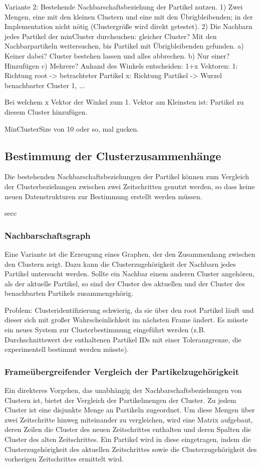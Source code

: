 Variante 2: Bestehende Nachbarschaftsbeziehung der Partikel nutzen.
1) Zwei Mengen, eine mit den kleinen Clustern und eine mit den Übrigbleibenden; in der Implementation nicht nötig (Clustergröße wird direkt getestet).
2) Die Nachbarn jedes Partikel der minCluster durchsuchen: gleicher Cluster? Mit den Nachbarpartikeln weitersuchen, bis Partikel mit Übrigbleibenden gefunden.
a) Keiner dabei? Cluster bestehen lassen und alles abbrechen.
b) Nur einer? Hinzufügen
c) Mehrere? Anhand des Winkels entscheiden:
1+x Vektoren:
1: Richtung root -> betrachteter Partikel
x: Richtung Partikel -> Wurzel benachbarter Cluster 1, ...

Bei welchem x Vektor der Winkel zum 1. Vektor am Kleinsten ist: Partikel zu diesem Cluster hinzufügen.

MinClusterSize von 10 oder so, mal gucken.


\subsection{Bestimmung der Clusterzusammenhänge}
Die bestehenden Nachbarschaftsbeziehungen der Partikel können zum Vergleich der Clusterbeziehungen zwischen zwei Zeitschritten genutzt werden, so dass keine neuen Datenstrukturen zur Bestimmung erstellt werden müssen. 

\gls{secc}

\subsubsection{Nachbarschaftsgraph}
Eine Variante ist die Erzeugung eines Graphen, der den Zusammenhang zwischen den Clustern zeigt. Dazu kann die Clusterzugehörigkeit der Nachbarn jedes Partikel untersucht werden. Sollte ein Nachbar einem anderen Cluster angehören, als der aktuelle Partikel, so sind der Cluster des aktuellen und der Cluster des benachbarten Partikels zusammengehörig.

Problem: Clusteridentifizierung schwierig, da sie über den root Partikel läuft und dieser sich mit großer Wahrscheinlichkeit im nächsten Frame ändert. Es müsste ein neues System zur Clusterbestimmung eingeführt werden (z.B. Durchschnittswert der enthaltenen Partikel IDs mit einer Toleranzgrenze, die experimentell bestimmt werden müsste).

\subsubsection{Frameübergreifender Vergleich der Partikelzugehörigkeit}
Ein direkteres Vorgehen, das unabhängig der Nachbarschaftsbeziehungen von Clustern ist, bietet der Vergleich der Partikelmengen der Cluster. Zu jedem Cluster ist eine disjunkte Menge an Partikeln zugeordnet. Um diese Mengen über zwei Zeitschritte hinweg miteinander zu vergleichen, wird eine Matrix aufgebaut, deren Zeilen die Cluster des neuen Zeitschrittes enthalten und deren Spalten die Cluster des alten Zeitschrittes. Ein Partikel wird in diese  eingetragen, indem die Clusterzugehörigkeit des aktuellen Zeitschrittes sowie die Clusterzugehörigkeit des vorherigen Zeitschrittes ermittelt wird.

